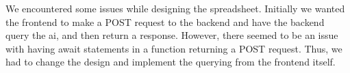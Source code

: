 \documentclass[12pt,a4paper]{cibb}
\begin{document}
We encountered some issues while designing the spreadsheet. Initially we wanted the frontend to make a POST request to the backend and have the backend query the ai, and then return a response. However, there seemed to be an issue with having await statements in a function returning a POST request. Thus, we had to change the design and implement the querying from the frontend itself.
\end{document}
